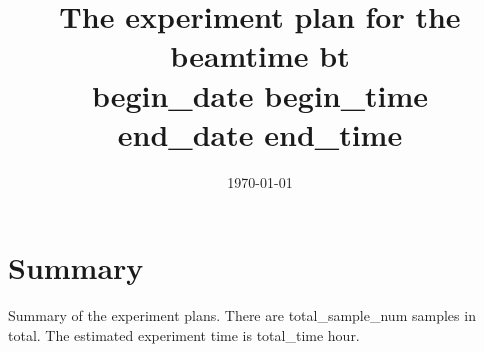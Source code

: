 \documentclass[prl,aps,tighten,amsmath,amssymb,floatfix]{revtex4-1}
\begin{document}
\title{The experiment plan for the beamtime {{bt}} \\
{{begin_date}} {{begin_time}} \\
{{end_date}} {{end_time}}}
\date{\today}
\maketitle

\section{Summary}
\begin{table}[htpb]
\caption{
Summary of the experiment plans.
There are {{total_sample_num}} samples in total.
The estimated experiment time is {{total_time}} hour.
}
\end{table}
\end{document}
